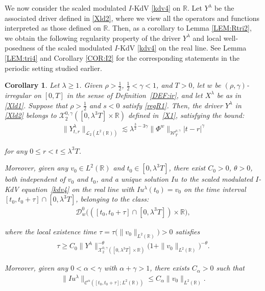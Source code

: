 \documentclass[letterpaper, 11pt,  reqno]{amsart}
\newtheorem{corollary}[theorem]{Corollary}
\newcommand{\1}{\hspace{0.5mm}\text{I}\hspace{0.5mm}}
\newcommand{\noi}{\noindent}
\newcommand{\R}{\mathbb{R}}
\newcommand{\CC}{\mathcal{C}}
\newcommand{\al}{\alpha}
\newcommand{\g}{\gamma}
\newcommand{\ld}{\lambda}
\newcommand{\ta}{\theta}
\newcommand{\les}{\lesssim}
\newcommand{\cL}{\mathcal{L}}
\newcommand{\cX}{\mathcal{X}}
\newcommand{\cD}{\mathscr{D}}
\newcommand{\W}{\mathcal{W}}
\numberwithin{equation}{section}
\numberwithin{theorem}{section}
\begin{document}
We now consider the 
 scaled modulated $I$-KdV \eqref{kdv4}
 on $\R$.
Let $Y^\ld$ be the associated
driver
defined in \eqref{Xld2}, 
where we view all the operators and functions 
interpreted as those defined on $\R$.
Then, 
as a corollary to 
Lemma \ref{LEM:Rtri2}, we obtain the following 
regularity property
of the driver $Y^\ld$
and local well-posedness of 
the  scaled modulated $I$-KdV \eqref{kdv4}
on the real line.
See
 Lemma \ref{LEM:tri4}
and Corollary \ref{COR:I2}
for the corresponding statements
in the periodic setting
studied earlier.





\begin{corollary}
\label{COR:RI1}
Let $\ld \ge 1$.
Given $\rho > \frac 12$, $\frac 12 < \g < 1$, and $T> 0$, 
let  $w$ be $(\rho,\g)$-irregular on $[0, T]$ in the sense of Definition~\ref{DEF:ir}, 
and let $X^\ld$ be as in \eqref{Xld1}.
Suppose that $\rho >  \frac 12$ and $s <  0$
satisfy 
\eqref{regR1}.
Then, 
the driver $Y^\ld$  in \eqref{Xld2}
belongs to $  \cX^{0, \g}_2([0, \ld^3T] \times \R)$ defined in~\eqref{X1}, 
satisfying the bound\textup{:}
\begin{align}
 \| Y^{\ld}_{t,r}  \|_{\cL_2 ( L^2(\R)) }
 \les
 \ld^{ \frac32  -3\g} 
  \|\Phi^{w}\|_{\W_{T}^{\rho, \g}}
 |t-r|^{\g}
\label{RW1}
\end{align}


\noi
for any $0\leq r<t \leq \ld^3T$.


Moreover, given any 
$v_0 \in L^2(\R)$ and  $t_0 \in [0, \ld^3 T]$, 
there exist $C_0 > 0$, $\ta > 0$, both independent of $v_0$ and $t_0$, 
and a unique solution $Iu$
to 
the scaled modulated $I$-KdV equation~\eqref{kdv4} 
on the real line
with $I u^\ld (t_0)= v_0$
on the time interval $[t_0, t_0 + \tau]\cap [0, \ld^3 T]$,  
belonging to the class\textup{:}
\begin{align*}
 \cD_{w}^0\big( ([t_0, t_0 + \tau] \cap [0, \ld^3 T]) \times \R\big), 
\end{align*}


\noi
where the local existence time 
$\tau = \tau \big(\| v_0 \|_{L^2(\R)}\big)> 0$ satisfies
\begin{align*}
\tau  \ge C_0 \|Y^\ld\|_{\cX^{0,\g}_2([0, \ld^3 T]\times \R)}^{-\ta} \big( 1 + \| v_0 \|_{L^2(\R)}\big)^{-\ta}.
\end{align*}

\noi
Moreover, given any $0 < \al < \g$
with $\al + \g > 1$, 
there exists $C_\al > 0$ such that 
\begin{align*}
 \| Iu^\ld \|_{\CC^\al ([t_0, t_0 + \tau];L^2(\R))}\le C_\al \|v_0\|_{L^2(\R)}.
\end{align*}





\end{corollary}
\end{document}
